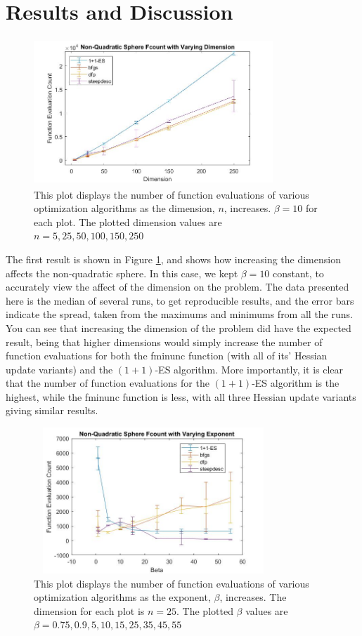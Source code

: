 \documentclass[sigconf, 7pt]{acmart}
\begin{document}
\section{Results and Discussion}
\label{result}


\begin{figure}[h]
\centering
  \includegraphics[height = 5.5cm, width=9cm]{A2DimFcount.jpg}
  \caption{This plot displays the number of function evaluations of various optimization algorithms as the dimension, $n$, increases. $\beta = 10$ for each plot. The plotted dimension values are $n=5, 25, 50, 100, 150, 250$}
  \label{fig:sdimen}
\end{figure}

The first result is shown in Figure \ref{fig:sdimen}, and shows how increasing the dimension affects the non-quadratic sphere. In this case, we kept $\beta = 10$ constant, to accurately view the affect of the dimension on the problem. The data presented here is the median of several runs, to get reproducible results, and the error bars indicate the spread, taken from the maximums and minimums from all the runs. You can see that increasing the dimension of the problem did have the expected result, being that higher dimensions would simply increase the number of function evaluations for both the fminunc function (with all of its' Hessian update variants) and the $(1+1)$-ES algorithm. More importantly, it is clear that the number of function evaluations for the $(1+1)$-ES algorithm is the highest, while the fminunc function is less, with all three Hessian update variants giving similar results. 

\begin{figure}[h]
\centering
  \includegraphics[height = 5.5cm, width=9cm]{A2BetaFcount.jpg}
  \caption{This plot displays the number of function evaluations of various optimization algorithms as the exponent, $\beta$, increases. The dimension for each plot is $n = 25$. The plotted $\beta$ values are $\beta = 0.75, 0.9, 5, 10, 15, 25, 35, 45, 55$}
  \label{fig:beta}
\end{figure}
\end{document}
